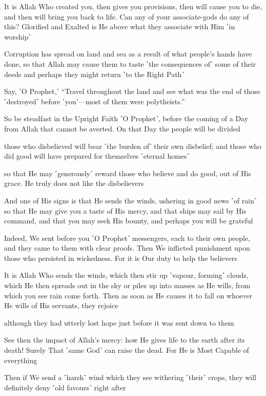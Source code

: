 It is Allah Who created you, then gives you provisions, then will cause you to die, and then will bring you back to life. Can any of your associate-gods do any of this? Glorified and Exalted is He above what they associate with Him ˹in worship˺

Corruption has spread on land and sea as a result of what people’s hands have done, so that Allah may cause them to taste ˹the consequences of˺ some of their deeds and perhaps they might return ˹to the Right Path˺

Say, ˹O Prophet,˺ “Travel throughout the land and see what was the end of those ˹destroyed˺ before ˹you˺—most of them were polytheists.”

So be steadfast in the Upright Faith ˹O Prophet˺, before the coming of a Day from Allah that cannot be averted. On that Day the people will be divided

those who disbelieved will bear ˹the burden of˺ their own disbelief; and those who did good will have prepared for themselves ˹eternal homes˺

so that He may ˹generously˺ reward those who believe and do good, out of His grace. He truly does not like the disbelievers

And one of His signs is that He sends the winds, ushering in good news ˹of rain˺ so that He may give you a taste of His mercy, and that ships may sail by His command, and that you may seek His bounty, and perhaps you will be grateful

Indeed, We sent before you ˹O Prophet˺ messengers, each to their own people, and they came to them with clear proofs. Then We inflicted punishment upon those who persisted in wickedness. For it is Our duty to help the believers

It is Allah Who sends the winds, which then stir up ˹vapour, forming˺ clouds, which He then spreads out in the sky or piles up into masses as He wills, from which you see rain come forth. Then as soon as He causes it to fall on whoever He wills of His servants, they rejoice

although they had utterly lost hope just before it was sent down to them

See then the impact of Allah’s mercy: how He gives life to the earth after its death! Surely That ˹same God˺ can raise the dead. For He is Most Capable of everything

Then if We send a ˹harsh˺ wind which they see withering ˹their˺ crops, they will definitely deny ˹old favours˺ right after

